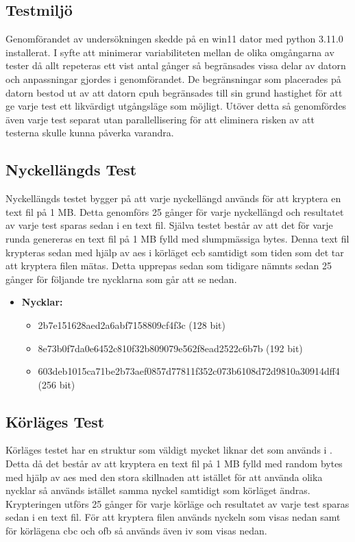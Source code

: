 \subsection{Testmiljö} %
Genomförandet av undersökningen skedde på en \gls{win11} dator med \gls{python} 3.11.0 installerat. I syfte att minimerar variabiliteten
mellan de olika omgångarna av tester då allt repeteras ett vist antal gånger så begränsades vissa delar av datorn och anpassningar gjordes i genomförandet.
De begränsningar som placerades på datorn bestod ut av att datorn \gls{cpuh} begränsades till sin grund hastighet för att ge
varje test ett likvärdigt utgångsläge som möjligt. Utöver detta så genomfördes även varje test separat utan parallellisering för att
eliminera risken av att testerna skulle kunna påverka varandra.

\subsection{Nyckellängds Test} %
\label{sec:nyckellangd-test}
Nyckellängds testet bygger på att varje nyckellängd används för att kryptera en text fil på 1 MB. Detta genomförs 25 gånger för
varje nyckellängd och resultatet av varje test sparas sedan i en text fil. Själva testet består av att det för varje runda
genereras en text fil på 1 MB fylld med slumpmässiga \gls{byte}s. Denna text fil krypteras sedan med hjälp av \acrshort{aes} i körläget \acrshort{ecb} samtidigt
som tiden som det tar att kryptera filen mätas. Detta upprepas sedan som tidigare nämnts sedan 25 gånger för följande tre nycklarna som går att se nedan.

\begin{itemize}
    \item []\textbf{Nycklar:}
    \begin{itemize}
        \item 2b7e151628aed2a6abf7158809cf4f3c (128 bit)
        \item 8e73b0f7da0e6452c810f32b809079e562f8ead2522c6b7b (192 bit)
        \item 603deb1015ca71be2b73aef0857d77811f352c073b6108d72d9810a30914dff4 (256 bit)
    \end{itemize}
\end{itemize}

\subsection{Körläges Test} %
\label{sec:körlages-test}
Körläges testet har en struktur som väldigt mycket liknar det som används i . Detta då det
består av att kryptera en text fil på 1 MB fylld med random bytes med hjälp av \acrshort{aes} med den stora skillnaden att istället för att använda olika nycklar så används
istället samma nyckel samtidigt som körläget ändras. Krypteringen utförs 25 gånger för varje körläge och resultatet av varje test sparas sedan i en text fil.
För att kryptera filen används nyckeln som visas nedan samt för körlägena \acrshort{cbc} och \acrshort{ofb} så används även \acrshort{iv} som visas nedan.


